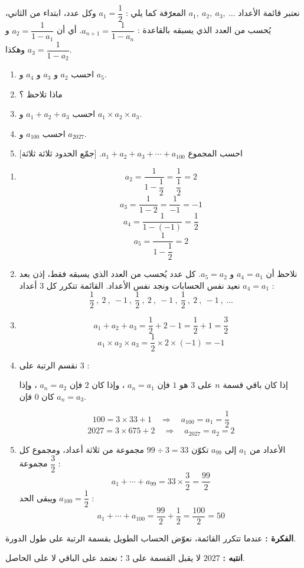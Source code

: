 \documentclass[12pt,a4paper]{article}
\begin{document}
\begin{corr}[title={تركيب: قائمة أعداد تتكرر}, stars=4, source={Axiomaths}]
نعتبر قائمة الأعداد $a_1,\ a_2,\ a_3,\ \dots$ المعرّفة كما يلي : $a_1=\dfrac{1}{2}$ وكل عدد، ابتداء من الثاني، يُحسب من العدد الذي يسبقه بالقاعدة : $a_{n+1}=\dfrac{1}{1-a_n}$.
أي أن $a_2=\dfrac{1}{1-a_1}$ و $a_3=\dfrac{1}{1-a_2}$ وهكذا.
\begin{enumerate}
  \item احسب $a_2$ و $a_3$ و $a_4$ و $a_5$.
  \item ماذا تلاحظ ؟
  \item احسب $a_1+a_2+a_3$ و $a_1\times a_2\times a_3$.
  \item احسب $a_{100}$ و $a_{2027}$.
  \item احسب المجموع $a_1+a_2+a_3+\cdots+a_{100}$. [جمّع الحدود ثلاثة ثلاثة]
\end{enumerate}
\axsol
\begin{enumerate}[itemsep=14pt]
  \item
  \[a_2=\dfrac{1}{1-\dfrac{1}{2}}=\dfrac{1}{\dfrac{1}{2}}=2\]
  \[a_3=\dfrac{1}{1-2}=\dfrac{1}{-1}=-1\]
  \[a_4=\dfrac{1}{1-(-1)}=\dfrac{1}{2}\]
  \[a_5=\dfrac{1}{1-\dfrac{1}{2}}=2\]
  \item نلاحظ أن $a_4=a_1$ و $a_5=a_2$.
  كل عدد يُحسب من العدد الذي يسبقه فقط، إذن بعد $a_4=a_1$ نعيد نفس الحسابات ونجد نفس الأعداد.
  القائمة تتكرر كل $3$ أعداد :
  \[\dfrac{1}{2}\ ,\ 2\ ,\ -1\ ,\ \dfrac{1}{2}\ ,\ 2\ ,\ -1\ ,\ \dfrac{1}{2}\ ,\ 2\ ,\ -1\ ,\ \dots\]
  \item
  \[a_1+a_2+a_3=\dfrac{1}{2}+2-1=\dfrac{1}{2}+1=\dfrac{3}{2}\]
  \[a_1\times a_2\times a_3=\dfrac{1}{2}\times2\times(-1)=-1\]
  \item نقسم الرتبة على $3$ :
  \begin{prop}
  إذا كان باقي قسمة $n$ على $3$ هو $1$ فإن $a_n=a_1$ ، وإذا كان $2$ فإن $a_n=a_2$ ، وإذا كان $0$ فإن $a_n=a_3$.
  \end{prop}
  \[100=3\times33+1\quad\Rightarrow\quad a_{100}=a_1=\dfrac{1}{2}\]
  \[2027=3\times675+2\quad\Rightarrow\quad a_{2027}=a_2=2\]
  \item الأعداد من $a_1$ إلى $a_{99}$ تكوّن $99\div3=33$ مجموعة من ثلاثة أعداد، ومجموع كل مجموعة $\dfrac{3}{2}$ :
  \[a_1+\cdots+a_{99}=33\times\dfrac{3}{2}=\dfrac{99}{2}\]
  ويبقى الحد $a_{100}=\dfrac{1}{2}$ :
  \[a_1+\cdots+a_{100}=\dfrac{99}{2}+\dfrac{1}{2}=\dfrac{100}{2}=50\]
\end{enumerate}
\textbf{الفكرة :} عندما تتكرر القائمة، نعوّض الحساب الطويل بقسمة الرتبة على طول الدورة.

\textbf{انتبه :} $2027$ لا يقبل القسمة على $3$ ؛ نعتمد على الباقي لا على الحاصل.
\end{corr}
\end{document}

